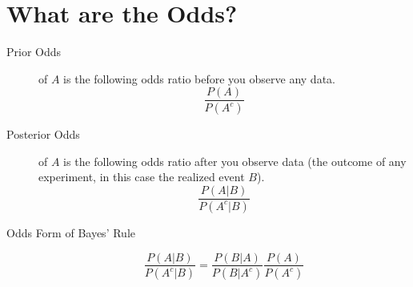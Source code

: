 \documentclass[11pt]{article}
\begin{document}
\section*{What are the Odds?}
\begin{description}
  \item[Prior Odds] of $A$ is the following odds ratio before you observe any data.
    \[\frac{P(A)}{P(A^c)}\]
  \item[Posterior Odds] of $A$ is the following odds ratio after you observe data (the outcome of any experiment, in this case the realized event $B$).
    \[\frac{P(A|B)}{P(A^c|B)}\]
  \item[Odds Form of Bayes' Rule]
    \[\frac{P(A|B)}{P(A^c|B)} = \frac{P(B|A)}{P(B|A^c)}\frac{P(A)}{P(A^c)}\]

\end{description}
\end{document}
